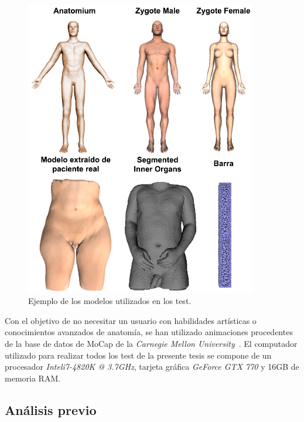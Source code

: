 \begin{figure}[ht]%
  \centering
  \includegraphics[width=0.90\textwidth]{IMG/modelos}
    \caption{Ejemplo de los modelos utilizados en los test.}
    \label{fig:models}
\end{figure}


Con el objetivo de no necesitar un usuario con habilidades artísticas o conocimientos avanzados de anatomía, se han utilizado animaciones procedentes de la base de datos de \ac{MoCap} de la \emph{Carnegie Mellon University}~\cite{CMUMCD}. El computador utilizado para realizar todos los test de la presente tesis se compone de un procesador \emph{Intel\textregistered i7-4820K @ 3.7GHz}, tarjeta gráfica \emph{GeForce GTX 770} y 16GB de memoria \acs{RAM}.
\clearpage

\subsection{Análisis previo}
\label{sec:ana_prev}


